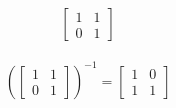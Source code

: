 \begin{align*}
    \begin{bmatrix}
        1 & 1 \\
        0 & 1
    \end{bmatrix}
\end{align*}

\begin{solution}
    \begin{align*}
        \left(\begin{bmatrix}
            1 & 1 \\
            0 & 1
        \end{bmatrix}\right)^{-1}
        = \begin{bmatrix}
            1 & 0 \\
            1 & 1
        \end{bmatrix}
    \end{align*}
\end{solution}